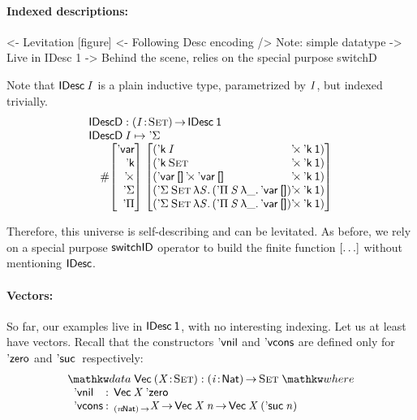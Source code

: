\paragraph{Indexed descriptions:}

\begin{wstructure}
<- Levitation [figure]
    <- Following Desc encoding
        /> Note: simple datatype
            -> Live in IDesc 1
    -> Behind the scene, relies on the special purpose switchD
\end{wstructure}

Note that $\IDesc{\V{I}}$ is a plain inductive type, parametrized
by \(\V{I}\), but indexed trivially.
%
\[\stk{
\IDescD : \PI{\V{I}}{\Set} \IDesc{\Unit} \\
\IDescD\: \V{I} \mapsto \SYMBDSigma \\
\quad
 \EnumT\vtup{r}{\SYMBDVar\\
                \SYMBDConst\\
                \DProd{}{}\\
                \SYMBDSigma\\
                \SYMBDPi}
         \; \vtup{l@{}l}{
  (\DProd{\DConst{\V{I}} &}{\DConst{\Unit}})                  \\
  (\DProd{\DConst{\Set}  &}{\DConst{\Unit}})                  \\
  (\DProd{\DVar{\Void}}{\DProd{\DVar{\Void}&}{\DConst{\Unit}}})  \\
  (\DSigma{\Set}{\LAM{\V{S}}
     \DProd{( \DPi{\V{S}}{\LAM{\_} \DVar{\Void}}) &}{\DConst{\Unit}}})     \\
  (\DSigma{\Set}{\LAM{\V{S}}
     \DProd{( \DPi{\V{S}}{\LAM{\_} \DVar{\Void}}) &}{\DConst{\Unit}}})     \\
                                   }
}\]

Therefore, this universe is self-describing and can be
levitated. As before, we rely on a special purpose $\F{switchID}$
operator to build the finite function $\bigRedBracket{\ldots}$
without mentioning \(\SYMBIDesc\).

\paragraph{Vectors:}

\newcommand{\VecD}{\F{VecD}}
\newcommand{\VecNil}{\etag{\CN{vnil}}}
\newcommand{\SYMBVecCons}{\etag{\CN{vcons}}\xspace}
\newcommand{\VecCons}[2]{\SYMBVecCons\:#1\:#2}

So far, our examples live in $\IDesc{\Unit}$, with no interesting
indexing. Let us at least have vectors. Recall
that the constructors $\VecNil$ and $\SYMBVecCons$ are defined only for
$\NatZero$ and $\NatSuc$ respectively:
%
\[
\stk{
\data \D{Vec}\: \PITEL{\V{X}}{\Set} : \PI{\V{i}}{\Nat} \Set \where \\
\;\;\begin{array}{@{}l@{\::\:\:}l@{\quad}l}
    \VecNil          & \D{Vec}\:\V{X}\:{\NatZero}   \\
    \SYMBVecCons & _{\PI{\V{n}}{\Nat}}\V{X} \To \D{Vec}\:{\V{X}}\:{\V{n}} \To \D{Vec}\:{\V{X}}\:{(\NatSuc{\V{n}})}
\end{array}
}
\]

